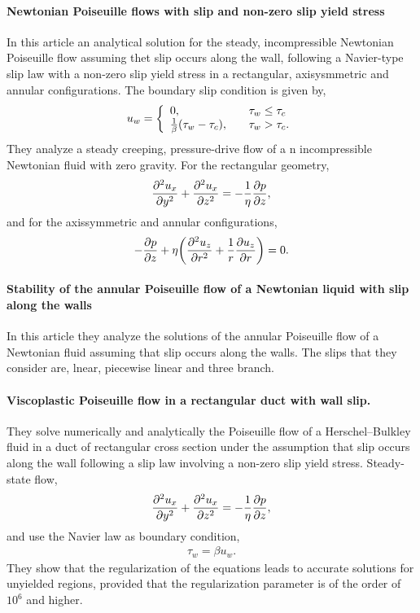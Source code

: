 \documentclass[main.tex]{subfiles}
\begin{document}
\paragraph{Newtonian Poiseuille flows with slip and non-zero slip yield stress}\cite{kaoullasNewtonianPoiseuilleFlows2013}
In this article an analytical solution for the steady, incompressible Newtonian Poiseuille flow assuming thet slip occurs along the wall, following a Navier-type slip law with a non-zero slip yield stress in a rectangular, axisysmmetric and annular configurations.
The boundary slip condition is given by,
\begin{gather*}
	u_w = \left\{
		\begin{array}{ll}
			0, &\quad \tau_w\leq\tau_c \\
			\frac{1}{\beta}\qty(\tau_w-\tau_c), &\quad\tau_w>\tau_c.
		\end{array} 
	\right.
\end{gather*}
They  analyze a steady creeping, pressure-drive flow of a n incompressible Newtonian fluid with zero gravity.
For the rectangular geometry,
\begin{gather*}
	\pdv[2]{u_x}{y} + \pdv[2]{u_x}{z} = -\frac{1}{\eta}\pdv{p}{z},
\end{gather*}
and for the axissymmetric and annular configurations,
\begin{gather*}
	-\pdv{p}{z}+\eta\qty(\pdv[2]{u_z}{r}+\frac{1}{r}\pdv{u_z}{r})=0.
\end{gather*}


\paragraph{Stability of the annular Poiseuille flow of a Newtonian liquid with slip along the walls}\cite{chatziminaStabilityAnnularPoiseuille2009}
In this article they analyze the solutions of the annular Poiseuille flow of a Newtonian fluid assuming that slip occurs along the walls.
The slips that they consider are, lnear, piecewise linear and three branch.


\paragraph{Viscoplastic Poiseuille flow in a rectangular duct with wall slip.}\cite{damianouCessationViscoplasticPoiseuille2014}
They solve numerically and analytically the Poiseuille flow of a Herschel–Bulkley fluid in a duct of rectangular cross section under the assumption that slip occurs along the wall following a slip law involving a non-zero slip yield stress.
Steady-state flow,
\begin{gather*}
	\pdv[2]{u_x}{y} + \pdv[2]{u_x}{z} = -\frac{1}{\eta}\pdv{p}{z},
\end{gather*}
and use the Navier law as boundary condition,
\begin{gather*}
	\tau_w = \beta u_w.
\end{gather*}
They show that the regularization of the equations leads to accurate solutions for unyielded regions, provided that the regularization parameter is of the order of $10^6$ and higher.



\end{document}
